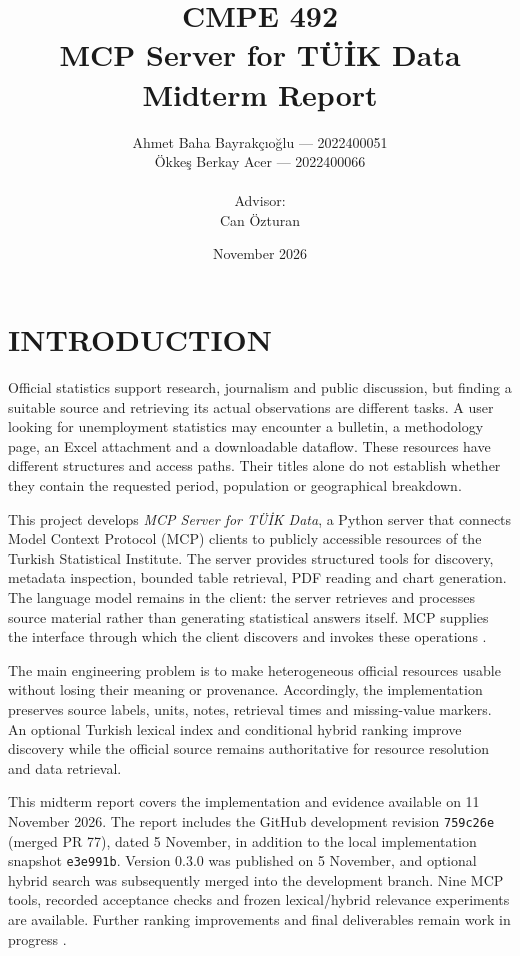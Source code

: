 \documentclass[a4paper,12pt]{report}
\newcommand{\tuik}{T\"U\.{I}K}
\newcommand{\code}[1]{\texttt{\small #1}}
\newcommand{\studentone}{Ahmet Baha Bayrakçıoğlu}
\newcommand{\studenttwo}{Ökkeş Berkay Acer}
\newcommand{\projectadvisor}{Can Özturan}
\begin{document}
\title{CMPE 492 \\ MCP Server for \tuik{} Data \\[0.5em] Midterm Report}
\author{\studentone{} --- 2022400051 \\ \studenttwo{} --- 2022400066 \\ \\ Advisor: \\ \projectadvisor}
\date{November 2026}
\hypersetup{pageanchor=false}
\maketitle
{}
\hypersetup{pageanchor=true}
\tableofcontents

\chapter{INTRODUCTION}
Official statistics support research, journalism and public discussion, but finding a suitable source and retrieving its actual observations are different tasks. A user looking for unemployment statistics may encounter a bulletin, a methodology page, an Excel attachment and a downloadable dataflow. These resources have different structures and access paths. Their titles alone do not establish whether they contain the requested period, population or geographical breakdown.

This project develops \emph{MCP Server for \tuik{} Data}, a Python server that connects Model Context Protocol (MCP) clients to publicly accessible resources of the Turkish Statistical Institute. The server provides structured tools for discovery, metadata inspection, bounded table retrieval, PDF reading and chart generation. The language model remains in the client: the server retrieves and processes source material rather than generating statistical answers itself. MCP supplies the interface through which the client discovers and invokes these operations \cite{mcp-tools}.

The main engineering problem is to make heterogeneous official resources usable without losing their meaning or provenance. Accordingly, the implementation preserves source labels, units, notes, retrieval times and missing-value markers. An optional Turkish lexical index and conditional hybrid ranking improve discovery while the official source remains authoritative for resource resolution and data retrieval.

This midterm report covers the implementation and evidence available on 11 November 2026. The report includes the GitHub development revision \code{759c26e} (merged PR 77), dated 5 November, in addition to the local implementation snapshot \code{e3e991b}. Version 0.3.0 was published on 5 November, and optional hybrid search was subsequently merged into the development branch. Nine MCP tools, recorded acceptance checks and frozen lexical/hybrid relevance experiments are available. Further ranking improvements and final deliverables remain work in progress \cite{project,acceptance,hybrid,release-record}.
\end{document}
